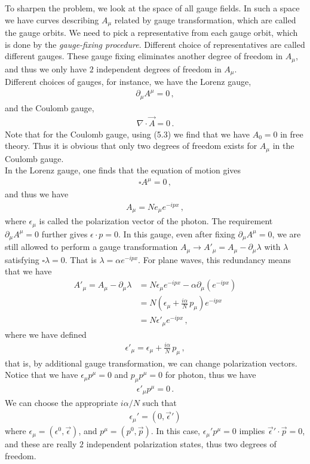 \documentclass[11pt, onesided]{book}
\theoremstyle{break}
\theoremstyle{break}
\newcommand{\pd}{\partial}
\begin{document}
To sharpen the problem, we look at the space of all gauge fields. In such a space we have curves describing $A_\mu$ related by gauge transformation, which are called the gauge orbits. We need to pick a representative from each gauge orbit, which is done by the \textit{gauge-fixing procedure}. Different choice of representatives are called different gauges. These gauge fixing eliminates another degree of freedom in $A_\mu$, and thus we only have $2$ independent degrees of freedom in $A_\mu$. \\

Different choices of gauges, for instance, we have the Lorenz gauge,
\begin{align*}
\pd_\mu A^\mu = 0\,,
\end{align*}
and the Coulomb gauge,
\begin{align*}
\nabla \cdot \vec{A} = 0\,.
\end{align*}
Note that for the Coulomb gauge, using (5.3) we find that we have $A_0 = 0$ in free theory. Thus it is obvious that only two degrees of freedom exists for $A_\mu$ in the Coulomb gauge.\\

In the Lorenz gauge, one finds that the equation of motion gives
\begin{align*}
\square A^\mu = 0\,,
\end{align*}
and thus we have
\begin{align*}
A_\mu = N e_\mu e^{-ipx}\,,
\end{align*}
where $\epsilon_\mu$ is called the polarization vector of the photon. The requirement $\pd_\mu A^\mu = 0$ further gives $\epsilon \cdot p = 0$. In this gauge, even after fixing $\pd_\mu A^\mu = 0$, we are still allowed to perform a gauge transformation $A_\mu \to A'_\mu = A_\mu -\pd_\mu \lambda$ with $\lambda$ satisfying $\square \lambda = 0$. That is $\lambda =\alpha e^{-ipx}$. For plane waves, this redundancy means that we have
\begin{align*}
A'_\mu = A_\mu - \pd_\mu \lambda 
&= N \epsilon_\mu e^{-ipx} - \alpha \pd_\mu (e^{-ipx})\\
&=N \left( \epsilon_\mu + \frac{i\alpha}{N}\, p_\mu\right) e^{-ipx}\\
&= N \epsilon'_\mu e^{-ipx}\,,
\end{align*}
where we have defined
\begin{align*}
\epsilon'_\mu = \epsilon_\mu + \frac{i\alpha}{N}\, p_\mu\,,
\end{align*}
that is, by additional gauge transformation, we can change polarization vectors. Notice that we have $\epsilon_\mu p^\mu = 0$ and $p_\mu p^\mu = 0$ for photon, thus we have
\begin{align*}
\epsilon'_\mu p^\mu = 0\,.
\end{align*}
We can choose the appropriate $i\alpha /N$ such that 
\begin{align*}
\epsilon_\mu' = (0 , \vec{\epsilon}')
\end{align*}
where $\epsilon_\mu = (\epsilon^0, \vec{\epsilon})$, and $p^\mu = (p^0, \vec{p})$. In this case, $\epsilon_\mu' p^\mu = 0$ implies $\vec{\epsilon}'\cdot \vec{p} = 0$, and these are really $2$ independent polarization states, thus two degrees of freedom. 
\end{document}
